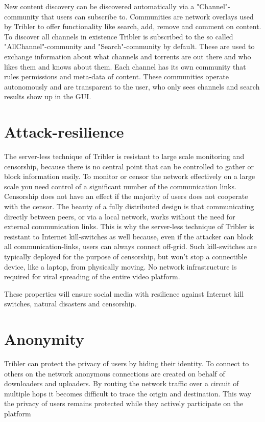 New content discovery can be discovered automatically via a "Channel"-community that users can subscribe to.
Communities are network overlays used by Tribler to offer functionality like search, add, remove and comment on content.
To discover all channels in existence Tribler is subscribed to the so called "AllChannel"-community and "Search"-community by default.
These are used to exchange information about what channels and torrents are out there and who likes them and knows about them.
Each channel has its own community that rules permissions and meta-data of content.
These communities operate autonomously and are transparent to the user, who only sees channels and search results show up in the GUI.


\section{Attack-resilience}

The server-less technique of Tribler is resistant to large scale monitoring and censorship, because there is no central point that can be controlled to gather or block information easily.
To monitor or censor the network effectively on a large scale you need control of a significant number of the communication links.
Censorship does not have an effect if the majority of users does not cooperate with the censor.
The beauty of a fully distributed design is that communicating directly between peers, or via a local network, works without the need for external communication links.
This is why the server-less technique of Tribler is resistant to Internet kill-switches as well because, even if the attacker can block all communication-links, users can always connect off-grid.
Such kill-switches are typically deployed for the purpose of censorship, but won't stop a connectible device, like a laptop, from physically moving.
No network infrastructure is required for viral spreading of the entire video platform.

These properties will ensure social media with resilience against Internet kill switches, natural disasters and censorship.


\section{Anonymity}

Tribler can protect the privacy of users by hiding their identity.
To connect to others on the network anonymous connections are created on behalf of downloaders and uploaders.
By routing the network traffic over a circuit of multiple hops it becomes difficult to trace the origin and destination.
This way the privacy of users remains protected while they actively participate on the platform

